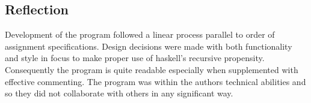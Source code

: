 \documentclass[11pt]{article}
\begin{document}
\subsection{Reflection}
Development of the program followed a linear process parallel to order of assignment specifications.  Design decisions were made with both functionality and style in focus to make proper use of haskell's recursive propensity. Consequently the program is quite readable especially when supplemented with effective commenting. The program was within the authors technical abilities and so they did not collaborate with others in any significant way.





\end{document}
